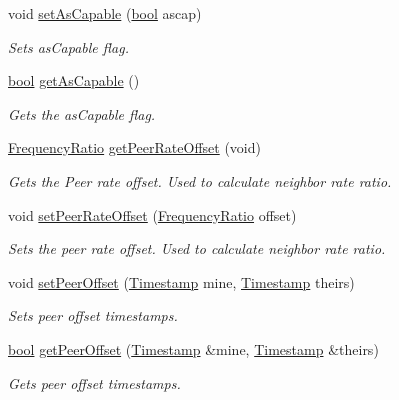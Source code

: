\begin{DoxyCompactItemize}
void \hyperlink{class_common_port_a6f66d6a79abf9ead80338a891ebadcf3}{set\+As\+Capable} (\hyperlink{avb__gptp_8h_af6a258d8f3ee5206d682d799316314b1}{bool} ascap)
\begin{DoxyCompactList}\small\item\em Sets as\+Capable flag. \end{DoxyCompactList}\item 
\hyperlink{avb__gptp_8h_af6a258d8f3ee5206d682d799316314b1}{bool} \hyperlink{class_common_port_a329f27c73986ce1901d7e1064e2a5af1}{get\+As\+Capable} ()
\begin{DoxyCompactList}\small\item\em Gets the as\+Capable flag. \end{DoxyCompactList}\item 
\hyperlink{ptptypes_8hpp_a84de47dc2ed889ecd2b61706d3ad0f2e}{Frequency\+Ratio} \hyperlink{class_common_port_afc63c3fbddbf777d6e2792f1d27e35e2}{get\+Peer\+Rate\+Offset} (void)
\begin{DoxyCompactList}\small\item\em Gets the Peer rate offset. Used to calculate neighbor rate ratio. \end{DoxyCompactList}\item 
void \hyperlink{class_common_port_ab118c6ab2834f61ffc82e474d619ffb1}{set\+Peer\+Rate\+Offset} (\hyperlink{ptptypes_8hpp_a84de47dc2ed889ecd2b61706d3ad0f2e}{Frequency\+Ratio} offset)
\begin{DoxyCompactList}\small\item\em Sets the peer rate offset. Used to calculate neighbor rate ratio. \end{DoxyCompactList}\item 
void \hyperlink{class_common_port_abdabe6c9152a3b381be89ac7c5b9c637}{set\+Peer\+Offset} (\hyperlink{class_timestamp}{Timestamp} mine, \hyperlink{class_timestamp}{Timestamp} theirs)
\begin{DoxyCompactList}\small\item\em Sets peer offset timestamps. \end{DoxyCompactList}\item 
\hyperlink{avb__gptp_8h_af6a258d8f3ee5206d682d799316314b1}{bool} \hyperlink{class_common_port_a2b43f12b4cc170a355a13691c6ef7c78}{get\+Peer\+Offset} (\hyperlink{class_timestamp}{Timestamp} \&mine, \hyperlink{class_timestamp}{Timestamp} \&theirs)
\begin{DoxyCompactList}\small\item\em Gets peer offset timestamps. \end{DoxyCompactList}\item 

\end{DoxyCompactItemize}
